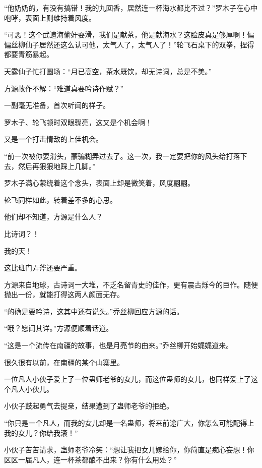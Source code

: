 
\begin{this_body}



“他奶奶的，有没有搞错！我的九回香，居然连一杯海水都比不过？”罗木子在心中咆哮，表面上则维持着风度。

“可恶！这个武遗海偷奸耍滑，我们是献茶，他是献海水？这脸皮真是够厚啊！偏偏丝柳仙子居然还这么认可他，太气人了，太气人了！”轮飞石桌下的双拳，捏得都要青筋暴起。

天露仙子忙打圆场：“月已高空，茶水既饮，却无诗词，总是不美。”

方源故作不解：“难道真要吟诗作赋？”

一副毫无准备，首次听闻的样子。

罗木子、轮飞顿时双眼骤亮，这又是个机会啊！

又是一个打击情敌的上佳机会。

“前一次被你耍滑头，蒙骗糊弄过去了。这一次，我一定要把你的风头给打落下去，然后再狠狠地踩上几脚。”

罗木子满心萦绕着这个念头，表面上却是微笑着，风度翩翩。

轮飞同样如此，转着差不多的心思。

他们却不知道，方源是什么人？

比诗词？！

我的天！

这比班门弄斧还要严重。

方源来自地球，古诗词一大堆，不乏名留青史的佳作，更有震古烁今的巨作。随便抛出一份，就能打得这两人颜面无存。

“的确是要吟诗，这其中还有说头。”乔丝柳回应方源的话。

“哦？愿闻其详。”方源便顺着话道。

“这是一个流传在南疆的故事，也是月亮节的由来。”乔丝柳开始娓娓道来。

很久很有以前，在南疆的某个山寨里。

一位凡人小伙子爱上了一位蛊师老爷的女儿，而这位蛊师的女儿，也同样爱上了这个凡人小伙儿。

小伙子鼓起勇气去提亲，结果遭到了蛊师老爷的拒绝。

“你只是一个凡人，而我的女儿却是一名蛊师，将来前途广大，你怎么可能配得上我的女儿？你给我滚！”

小伙子苦苦请求，蛊师老爷冷笑：“想让我把女儿嫁给你，你简直是痴心妄想！你区区一届凡人，连一杯茶都酿不出来？你有什么用处？”


\end{this_body}
